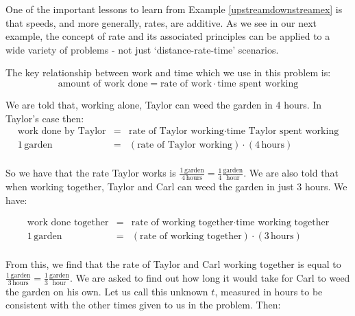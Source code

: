 \medskip

One of the important lessons to learn from Example \ref{upstreamdownstreamex} is that speeds, and more generally, rates, are additive.  As we see in our next example, the concept of rate and its associated principles can be applied to a wide variety of problems - not just `distance-rate-time' scenarios.

\medskip

{
The key relationship between work and time which we use in this problem is: \[\text{amount of work done} = \text{rate of work} \cdot \text{time spent working} \]

We are told that, working alone, Taylor can weed the garden in 4 hours.  In Taylor's case then: \[ \begin{array}{rcl}

\text{work done by Taylor} & = & \text{rate of Taylor working} \cdot \text{time Taylor spent working} \\

1 \, \text{garden} & = & (\text{rate of Taylor working}) \cdot (4 \, \text{hours}) \\ \end{array} \]

So we have that the rate Taylor works is $\frac{1 \, \text{garden}}{ 4 \, \text{hours}} = \frac{1}{4} \frac{\text{garden}}{\text{hour}}$.    We are also told that when working together, Taylor and Carl can weed the garden in just 3 hours.  We have:

\[ \begin{array}{rcl}

\text{work done together} & = & \text{rate of working together} \cdot \text{time  working together} \\

1 \, \text{garden} & = & (\text{rate of working together}) \cdot (3 \, \text{hours}) \\ \end{array} \]

From this, we find that the rate of Taylor and Carl working together is equal to $\frac{1 \, \text{garden}}{3 \, \text{hours}} = \frac{1}{3} \frac{\text{garden}}{\text{hour}}$.   We are asked to find out how long it would take for Carl to weed the garden on his own.  Let us call this unknown $t$, measured in hours to be consistent with the other times given to us in the problem. Then:

}
